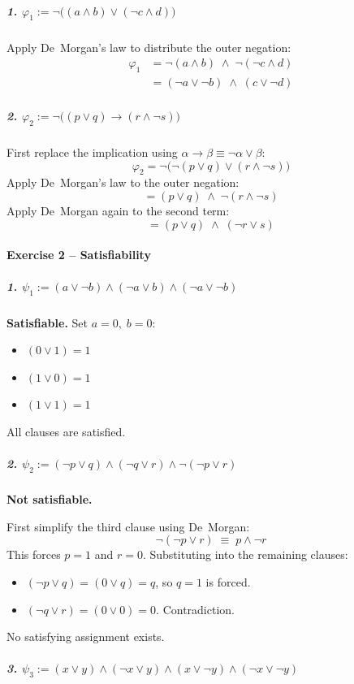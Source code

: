 \documentclass[11pt, a4paper]{article}
\theoremstyle{definition}
\theoremstyle{remark}
\begin{document}
\subparagraph{1. $\varphi_1 := \lnot\bigl((a\land b)\lor(\lnot c\land d)\bigr)$}

Apply De~Morgan's law to distribute the outer negation:
\begin{align*}
\varphi_1
&= \lnot(a\land b)\;\land\;\lnot(\lnot c\land d) \\
&= (\lnot a\lor\lnot b)\;\land\;(c\lor\lnot d)
\end{align*}

\subparagraph{2. $\varphi_2 := \lnot\bigl((p\lor q)\to(r\land\lnot s)\bigr)$}

First replace the implication using $\alpha\to\beta\equiv\lnot\alpha\lor\beta$:
\[
\varphi_2 = \lnot\bigl(\lnot(p\lor q)\lor(r\land\lnot s)\bigr)
\]
Apply De~Morgan's law to the outer negation:
\[
= (p\lor q)\;\land\;\lnot(r\land\lnot s)
\]
Apply De~Morgan again to the second term:
\[
= (p\lor q)\;\land\;(\lnot r\lor s)
\]

\paragraph{Exercise 2 -- Satisfiability}

\subparagraph{1. $\psi_1 := (a\lor\lnot b)\land(\lnot a\lor b)\land(\lnot a\lor\lnot b)$}

\textbf{Satisfiable.}  Set $a=0,\;b=0$:
\begin{itemize}
  \item $(0\lor 1)=1$
  \item $(1\lor 0)=1$
  \item $(1\lor 1)=1$
\end{itemize}
All clauses are satisfied.

\subparagraph{2. $\psi_2 := (\lnot p\lor q)\land(\lnot q\lor r)\land\lnot(\lnot p\lor r)$}

\textbf{Not satisfiable.}

First simplify the third clause using De~Morgan:
\[
\lnot(\lnot p\lor r) \;\equiv\; p\land\lnot r
\]
This forces $p=1$ and $r=0$.  Substituting into the remaining clauses:
\begin{itemize}
  \item $(\lnot p\lor q) = (0\lor q) = q$, so $q=1$ is forced.
  \item $(\lnot q\lor r) = (0\lor 0) = 0$.  Contradiction.
\end{itemize}
No satisfying assignment exists.

\subparagraph{3. $\psi_3 := (x\lor y)\land(\lnot x\lor y)\land(x\lor\lnot y)\land(\lnot x\lor\lnot y)$}
\end{document}

